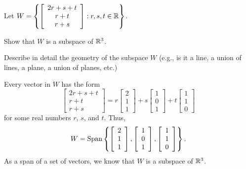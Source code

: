 \begin{example}  Let $W = \left\{\left[ \begin{array}{c} 2r+s+t \\ r+t \\ r+s \end{array} \right] : r,s,t \in \mathbb{R} \right\}$. 
\ba
\item Show that $W$ is a subspace of $\mathbb{R}^3$. 

\item Describe in detail the geometry of the subspace $W$ (e.g., is it a line, a union of lines, a plane, a union of planes, etc.) 

\ea

\ExampleSolution

\ba
\item Every vector in $W$ has the form
\[\left[ \begin{array}{c}  2r+s+t \\ r+t \\ r+s \end{array} \right] = r\left[ \begin{array}{c} 2 \\ 1 \\ 1  \end{array} \right] + s\left[ \begin{array}{c} 1 \\ 0 \\ 1 \end{array} \right] + t\left[ \begin{array}{c} 1 \\ 1 \\ 0  \end{array} \right]\]
for some real numbers $r$, $s$, and $t$. Thus, 
\[W = \text{Span}\left\{\left[ \begin{array}{c} 2 \\ 1 \\ 1  \end{array} \right], \left[ \begin{array}{c} 1 \\ 0 \\ 1 \end{array} \right], \left[ \begin{array}{c} 1 \\ 1 \\ 0  \end{array} \right] \right\}.\]
 As a span of a set of vectors, we know that $W$ is a subspace of $\mathbb{R}^3$. 


\end{example}
